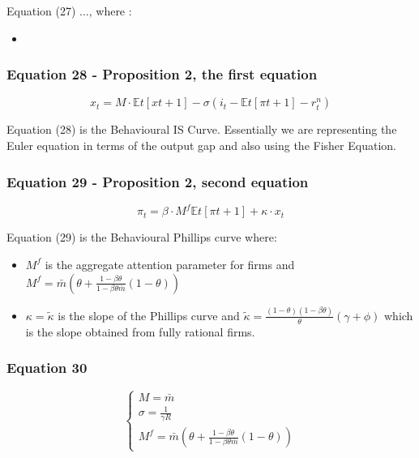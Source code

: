 \documentclass{article}
\begin{document}
Equation (27) ..., where : 
\begin{itemize}
    \item 
\end{itemize}

\subsubsection*{Equation 28 - Proposition 2, the first equation}
\begin{equation}
    x_{t}=M\cdot\mathbb{E}{t}\left[x{t+1}\right]-\sigma(i_{t}-\mathbb{E}{t}\left[\pi{t+1}\right]-r^{n}_{t})
\end{equation}

Equation (28) is the Behavioural IS Curve. Essentially we are representing the Euler equation in terms of the output gap and also using the Fisher Equation.

\subsubsection*{Equation 29 - Proposition 2, second equation}
\begin{equation}
    \pi_{t}=\beta\cdot M^{f} \mathbb{E}t\left[\pi{t+1}\right]+\kappa\cdot x_{t}
\end{equation}

Equation (29) is the Behavioural Phillips curve where: 
\begin{itemize}
    \item $M^{f}$ is the aggregate attention parameter for firms and $M^{f}=\bar{m}\left(\theta+\frac{1-\beta\theta}{1-\beta\theta\bar{m}}(1-\theta)\right)$
    \item $\kappa=\widetilde{\kappa}$  is the slope of the Phillips curve and $\widetilde{\kappa} =  \frac{(1-\theta)(1-\beta\theta)}{\theta}(\gamma+\phi)$ which is the slope obtained from fully rational firms. 

\end{itemize}

\subsubsection*{Equation 30}
\begin{equation}
    \begin{cases}
        M=\bar{m} \\
        \sigma=\frac{1}{\gamma R} \\
        M^{f}=\bar{m}\left(\theta+\frac{1-\beta\theta}{1-\beta\theta\bar{m}}(1-\theta)\right)
    \end{cases}
\end{equation}
\end{document}
